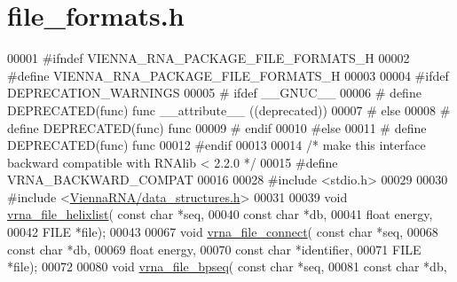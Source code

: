 \hypertarget{file__formats_8h_source}{}\section{file\+\_\+formats.\+h}
\label{file__formats_8h_source}

\begin{DoxyCode}
00001 \textcolor{preprocessor}{#ifndef VIENNA\_RNA\_PACKAGE\_FILE\_FORMATS\_H}
00002 \textcolor{preprocessor}{#define VIENNA\_RNA\_PACKAGE\_FILE\_FORMATS\_H}
00003 
00004 \textcolor{preprocessor}{#ifdef DEPRECATION\_WARNINGS}
00005 \textcolor{preprocessor}{# ifdef \_\_GNUC\_\_}
00006 \textcolor{preprocessor}{#  define DEPRECATED(func) func \_\_attribute\_\_ ((deprecated))}
00007 \textcolor{preprocessor}{# else}
00008 \textcolor{preprocessor}{#  define DEPRECATED(func) func}
00009 \textcolor{preprocessor}{# endif}
00010 \textcolor{preprocessor}{#else}
00011 \textcolor{preprocessor}{# define DEPRECATED(func) func}
00012 \textcolor{preprocessor}{#endif}
00013 
00014 \textcolor{comment}{/* make this interface backward compatible with RNAlib < 2.2.0 */}
00015 \textcolor{preprocessor}{#define VRNA\_BACKWARD\_COMPAT}
00016 
00028 \textcolor{preprocessor}{#include <stdio.h>}
00029 
00030 \textcolor{preprocessor}{#include <\hyperlink{data__structures_8h}{ViennaRNA/data\_structures.h}>}
00031 
00039 \textcolor{keywordtype}{void} \hyperlink{group__file__utils_gaaface7db12fadc3d271641c4515ab6e4}{vrna\_file\_helixlist}( \textcolor{keyword}{const} \textcolor{keywordtype}{char} *seq,
00040                           \textcolor{keyword}{const} \textcolor{keywordtype}{char} *db,
00041                           \textcolor{keywordtype}{float} energy,
00042                           FILE *file);
00043 
00067 \textcolor{keywordtype}{void} \hyperlink{group__file__utils_gab69682373ccca1e0e28cc967eec07745}{vrna\_file\_connect}( \textcolor{keyword}{const} \textcolor{keywordtype}{char} *seq,
00068                         \textcolor{keyword}{const} \textcolor{keywordtype}{char} *db,
00069                         \textcolor{keywordtype}{float} energy,
00070                         \textcolor{keyword}{const} \textcolor{keywordtype}{char} *identifier,
00071                         FILE *file);
00072 
00080 \textcolor{keywordtype}{void} \hyperlink{group__file__utils_ga9b462e6f202594af5d3fa56e280d633f}{vrna\_file\_bpseq}( \textcolor{keyword}{const} \textcolor{keywordtype}{char} *seq,
00081                       \textcolor{keyword}{const} \textcolor{keywordtype}{char} *db,

\end{DoxyCode}
